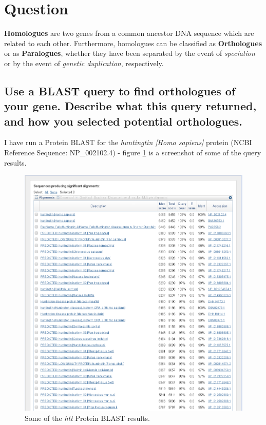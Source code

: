 \section{Question}

\textbf{Homologues} are two genes from a common ancestor DNA sequence which are related to each other. Furthermore, homologues can be classified as \textbf{Orthologues} or as \textbf{Paralogues}, whether they have been separated by the event of \textit{speciation} or by the event of \textit{genetic duplication}, respectively.

\subsection{Use a BLAST query to find orthologues of your gene. Describe what this query returned, and how you selected potential orthologues.}

I have run a Protein BLAST for the \textit{huntingtin [Homo sapiens]
} protein (NCBI Reference Sequence: NP\_002102.4) - figure \ref{fig:htt-blastp-results} is a screenshot of some of the query results.

\begin{figure}[ht]
    \centering
    \includegraphics[width=\linewidth]{res/htt-blastp-results.png}
    \caption{Some of the \textit{htt} Protein BLAST results.}
    \label{fig:htt-blastp-results}
\end{figure}

